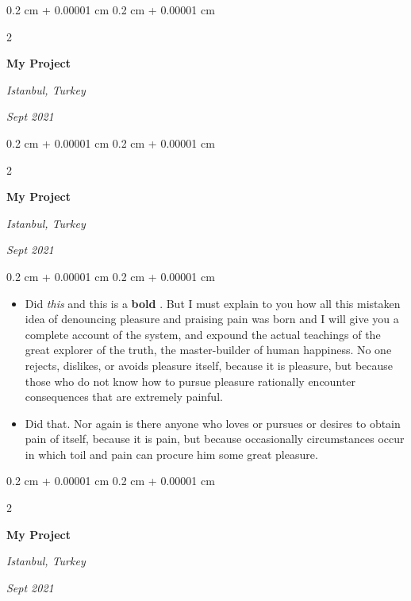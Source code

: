 \documentclass[10pt, letterpaper]{article}
\newenvironment{highlights}{
    \begin{itemize}[
        topsep=0.10 cm,
        parsep=0.10 cm,
        partopsep=0pt,
        itemsep=0pt,
        leftmargin=0.4 cm + 10pt
    ]
}{
    \end{itemize}
} %
\newenvironment{onecolentry}{
    \begin{adjustwidth}{
        0.2 cm + 0.00001 cm
    }{
        0.2 cm + 0.00001 cm
    }
}{
    \end{adjustwidth}
} %
\newenvironment{twocolentry}[2][]{
    \onecolentry
    \def\secondColumn{#2}
    \setcolumnwidth{\fill, 4.5 cm}
    \begin{paracol}{2}
}{
    \switchcolumn \raggedleft \secondColumn
    \end{paracol}
    \endonecolentry
} %
\let\hrefWithoutArrow\href
\renewcommand{\href}[2]{\hrefWithoutArrow{#1}{\ifthenelse{\equal{#2}{}}{ }{#2 }\raisebox{.15ex}{\footnotesize \faExternalLink*}}}
\begin{document}
        \vspace{0.2 cm}

        \begin{twocolentry}{
        \textit{Istanbul, Turkey}    
            
        \textit{Sept 2021}}
            \textbf{My Project}
        \end{twocolentry}



        \vspace{0.2 cm}

        \begin{twocolentry}{
        \textit{Istanbul, Turkey}    
            
        \textit{Sept 2021}}
            \textbf{My Project}
        \end{twocolentry}

        \vspace{0.10 cm}
        \begin{onecolentry}
            \begin{highlights}
                \item Did \textit{this} and this is a \textbf{bold} \href{https://example.com}{link}. But I must explain to you how all this mistaken idea of denouncing pleasure and praising pain was born and I will give you a complete account of the system, and expound the actual teachings of the great explorer of the truth, the master-builder of human happiness. No one rejects, dislikes, or avoids pleasure itself, because it is pleasure, but because those who do not know how to pursue pleasure rationally encounter consequences that are extremely painful.
                \item Did that. Nor again is there anyone who loves or pursues or desires to obtain pain of itself, because it is pain, but because occasionally circumstances occur in which toil and pain can procure him some great pleasure.
            \end{highlights}
        \end{onecolentry}


        \vspace{0.2 cm}

        \begin{twocolentry}{
        \textit{Istanbul, Turkey}    
            
        \textit{Sept 2021}}
            \textbf{My Project}
        \end{twocolentry}
\end{document}
